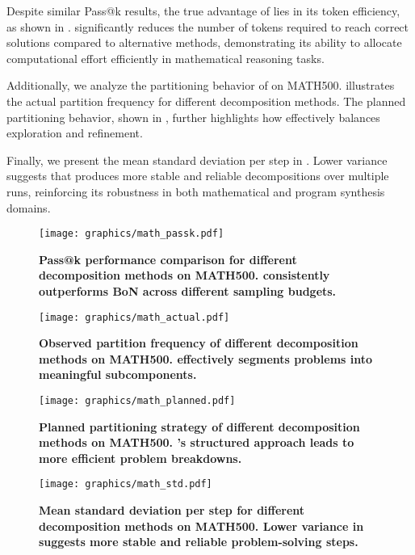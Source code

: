 Despite similar Pass@k results, the true advantage of \decomp lies in its token efficiency, as shown in . \decomp significantly reduces the number of tokens required to reach correct solutions compared to alternative methods, demonstrating its ability to allocate computational effort efficiently in mathematical reasoning tasks.

Additionally, we analyze the partitioning behavior of \decomp on MATH500.  illustrates the actual partition frequency for different decomposition methods. The planned partitioning behavior, shown in , further highlights how \decomp effectively balances exploration and refinement.

Finally, we present the mean standard deviation per step in . Lower variance suggests that \decomp produces more stable and reliable decompositions over multiple runs, reinforcing its robustness in both mathematical and program synthesis domains.

\begin{figure}[ht]
    \centering
    \texttt{[image: graphics/math\_passk.pdf]}
    \caption{\textbf{Pass@k performance comparison for different decomposition methods on MATH500. \decomp consistently outperforms BoN across different sampling budgets.}}
    \label{fig:math_passk}
\end{figure}

\begin{figure}[ht]
    \centering
    \texttt{[image: graphics/math\_actual.pdf]}
    \caption{\textbf{Observed partition frequency of different decomposition methods on MATH500. \decomp effectively segments problems into meaningful subcomponents.}}
    \label{fig:math_actualpart}
\end{figure}

\begin{figure}[ht]
    \centering
    \texttt{[image: graphics/math\_planned.pdf]}
    \caption{\textbf{Planned partitioning strategy of different decomposition methods on MATH500. \decomp’s structured approach leads to more efficient problem breakdowns.}}
    \label{fig:math_plannedpart}
\end{figure}

\begin{figure}[ht]
    \centering
    \texttt{[image: graphics/math\_std.pdf]}
    \caption{\textbf{Mean standard deviation per step for different decomposition methods on MATH500. Lower variance in \decomp suggests more stable and reliable problem-solving steps.}}
    \label{fig:math_stdstep}
\end{figure}


